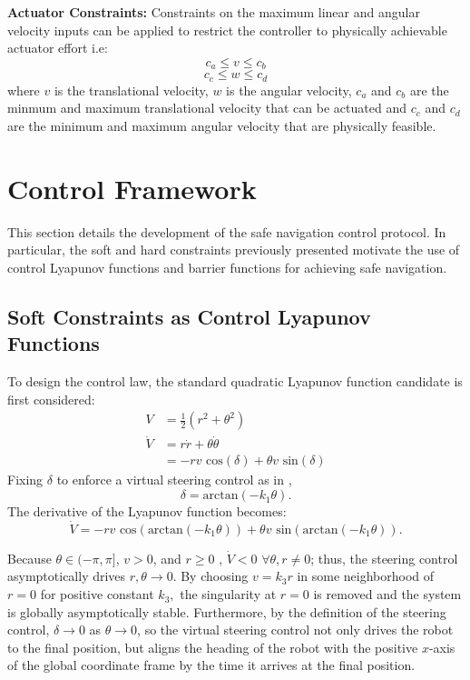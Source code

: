 \documentclass[journal]{IEEEconf}
\begin{document}
\textbf{Actuator Constraints:} Constraints on the maximum linear and angular velocity inputs can be applied to restrict the controller to physically achievable actuator effort i.e:
\begin{equation} c_a \leq v  \leq c_b \end{equation}
\begin{equation} c_c \leq w \leq c_d \end{equation}
where $v$ is the translational velocity, $w$ is the angular velocity, $c_a$ and $c_b$ are the minmum and maximum translational velocity that can be actuated and $c_c$ and $c_d$ are the minimum and maximum angular velocity that are physically feasible.

\section{Control Framework}
This section details the development of the safe navigation control protocol. In particular, the soft and hard constraints previously presented motivate the use of control Lyapunov functions and barrier functions for achieving safe navigation.

\subsection{Soft Constraints as Control Lyapunov Functions}
To design the control law, the standard quadratic Lyapunov function candidate is first considered:
\begin{align}
V&=\frac{1}{2}(r^2+\theta^2)\\
\dot{V}&=r \dot{r}+\theta \dot{\theta}\\
&=-r v \text{ cos}(\delta) + \theta v \text{ sin}(\delta)
\end{align}
Fixing $\delta$ to enforce a virtual steering control as in \cite{park2011}, 
\begin{equation} 
\delta = \text{arctan}(-k_1\theta). \end{equation}
The derivative of the Lyapunov function becomes:
\begin{equation}
\dot{V}=-r v \text{ cos}(\text{arctan}(-k_1\theta)) + \theta v \text{ sin}(\text{arctan}(-k_1\theta)).
\end{equation} 

Because $\theta\in (-\pi,\pi]$, $v>0$, and $r\geq 0$ , $\dot{V}<0$ $\forall \theta,r\neq0$; thus, the steering control asymptotically drives $r,\theta\to 0$. By choosing $v=k_3 r$ in some neighborhood of $r=0$ for positive constant $k_3,$ the singularity at $r=0$ is removed and the system is globally asymptotically stable. Furthermore, by the definition of the steering control, $\delta\to 0$ as $\theta \to 0$, so the virtual steering control not only drives the robot to the final position, but aligns the heading of the robot with the positive $x$-axis of the global coordinate frame by the time it arrives at the final position. 
\end{document}
